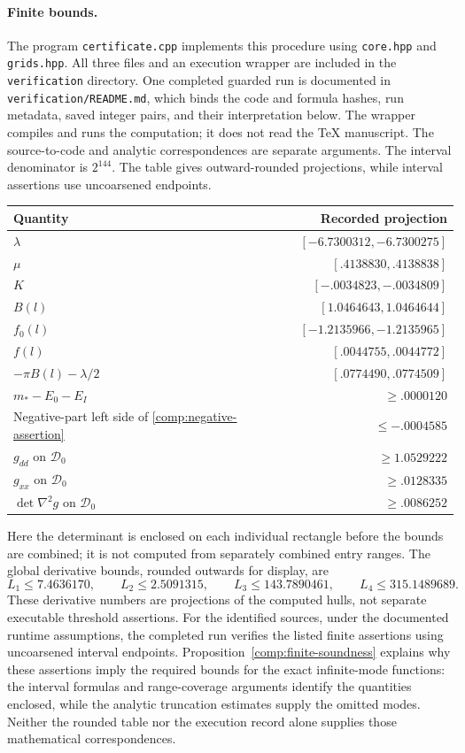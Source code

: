 \paragraph{Finite bounds.}
The program \texttt{certificate.cpp} implements this procedure using
\texttt{core.hpp} and \texttt{grids.hpp}. All three files and an
execution wrapper are included in the \texttt{verification} directory.
One completed guarded run is documented in
\texttt{verification/README.md}, which binds the code and formula hashes,
run metadata, saved integer pairs, and their interpretation below.
The wrapper compiles and runs the computation; it does not read the TeX
manuscript. The source-to-code and analytic correspondences are separate
arguments.
The interval denominator is $2^{144}$. The table gives outward-rounded
projections, while interval assertions use uncoarsened endpoints.
\begin{center}
\begin{tabular}{lr}
\toprule
Quantity & Recorded projection\\
\midrule
$\lambda$ & $[-6.7300312,-6.7300275]$\\
$\mu$ & $[.4138830,.4138838]$\\
$K$ & $[-.0034823,-.0034809]$\\
$B(l)$ & $[1.0464643,1.0464644]$\\
$f_0(l)$ & $[-1.2135966,-1.2135965]$\\
$f(l)$ & $[.0044755,.0044772]$\\
$-\pi B(l)-\lambda/2$ & $[.0774490,.0774509]$\\
$m_*-E_0-E_I$ & $\ge .0000120$\\
Negative-part left side of \eqref{comp:negative-assertion}
 & $\le -.0004585$\\
$g_{dd}$ on $\mathcal D_0$ & $\ge1.0529222$\\
$g_{xx}$ on $\mathcal D_0$ & $\ge .0128335$\\
$\det\nabla^2g$ on $\mathcal D_0$ & $\ge .0086252$\\
\bottomrule
\end{tabular}
\end{center}
Here the determinant is enclosed on each individual rectangle before
the bounds are combined; it is not computed from separately combined
entry ranges. The global derivative bounds, rounded outwards for
display, are
\[
 L_1\le7.4636170,\qquad L_2\le2.5091315,\qquad
 L_3\le143.7890461,\qquad L_4\le315.1489689.
\]
These derivative numbers are projections of the computed hulls, not
separate executable threshold assertions. For the identified sources,
under the documented runtime assumptions, the completed run verifies the
listed finite assertions using uncoarsened interval endpoints.
Proposition~\ref{comp:finite-soundness} explains why these assertions
imply the required bounds for the exact infinite-mode functions:
the interval formulas and range-coverage arguments identify the
quantities enclosed, while the analytic truncation estimates supply
the omitted modes. Neither the rounded table nor the execution record
alone supplies those mathematical correspondences.

